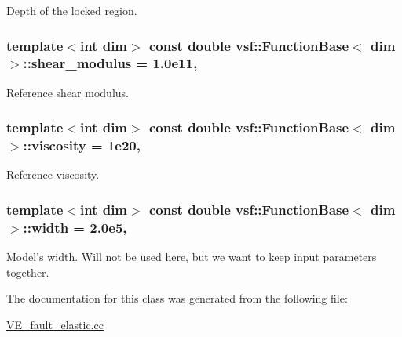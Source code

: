 Depth of the locked region. \hypertarget{classvsf_1_1FunctionBase_a6fc26a27ba1d3a74dfe144a16d7893aa}{
\subsubsection[{shear\-\_\-modulus}]{\setlength{\rightskip}{0pt plus 5cm}template$<$int dim$>$ const double {\bf vsf\-::\-Function\-Base}$<$ dim $>$\-::shear\-\_\-modulus = 1.\-0e11\hspace{0.3cm}{\ttfamily [static]}, {\ttfamily [protected]}}}\label{classvsf_1_1FunctionBase_a6fc26a27ba1d3a74dfe144a16d7893aa}
Reference shear modulus. \hypertarget{classvsf_1_1FunctionBase_af8a2b8711f526a821e1a37a396c9b48f}{
\subsubsection[{viscosity}]{\setlength{\rightskip}{0pt plus 5cm}template$<$int dim$>$ const double {\bf vsf\-::\-Function\-Base}$<$ dim $>$\-::viscosity = 1e20\hspace{0.3cm}{\ttfamily [static]}, {\ttfamily [protected]}}}\label{classvsf_1_1FunctionBase_af8a2b8711f526a821e1a37a396c9b48f}
Reference viscosity. \hypertarget{classvsf_1_1FunctionBase_ad2bf6791357d301b7d838b6188ef646e}{
\subsubsection[{width}]{\setlength{\rightskip}{0pt plus 5cm}template$<$int dim$>$ const double {\bf vsf\-::\-Function\-Base}$<$ dim $>$\-::width = 2.\-0e5\hspace{0.3cm}{\ttfamily [static]}, {\ttfamily [protected]}}}\label{classvsf_1_1FunctionBase_ad2bf6791357d301b7d838b6188ef646e}
Model's width. Will not be used here, but we want to keep input parameters together. 

The documentation for this class was generated from the following file\-:\begin{DoxyCompactItemize}
\item 
\hyperlink{VE__fault__elastic_8cc}{V\-E\-\_\-fault\-\_\-elastic.\-cc}\end{DoxyCompactItemize}
